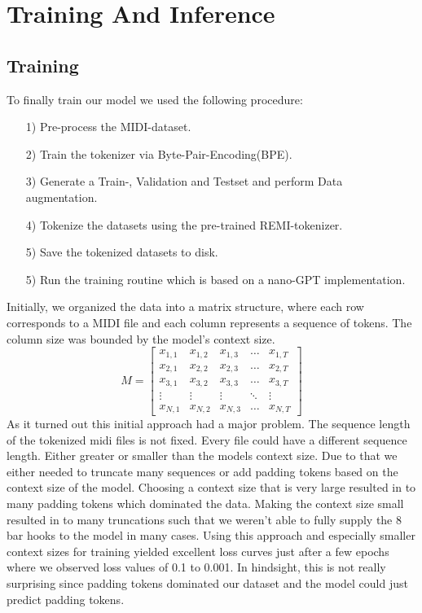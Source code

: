 \documentclass[a4paper,12pt]{extarticle}
\begin{document}
\section{Training And Inference}
\subsection{Training}
    \label{sec:Training}
To finally train our model we used the following procedure:
    \begin{itemize}
        \item[1)] Pre-process the MIDI-dataset.
        \item[2)] Train the tokenizer via Byte-Pair-Encoding(BPE).
        \item[3)] Generate a Train-, Validation and Testset and perform Data augmentation.
        \item[4)] Tokenize the datasets using the pre-trained REMI-tokenizer.
        \item[5)] Save the tokenized datasets to disk.
        \item[5)] Run the training routine which is based on a nano-GPT implementation.
    \end{itemize}
Initially, we organized the data into a matrix structure, where each row corresponds to a MIDI file and each column represents a sequence of tokens. The column size was bounded by the model's context size.
\[
M =
\begin{bmatrix}
    x_{1,1} & x_{1,2} & x_{1,3} & \dots & x_{1,T} \\
    x_{2,1} & x_{2,2} & x_{2,3} & \dots & x_{2,T} \\
    x_{3,1} & x_{3,2} & x_{3,3} & \dots & x_{3,T} \\
    \vdots  & \vdots  & \vdots  & \ddots & \vdots  \\
    x_{N,1} & x_{N,2} & x_{N,3} & \dots & x_{N,T}
\end{bmatrix}
\]
As it turned out this initial approach had a major problem.
The sequence length of the tokenized midi files is not fixed. Every file could have a different sequence length. Either greater or smaller than the models context size. Due to that we either needed to truncate many sequences or add padding tokens based on the context size of the model. Choosing a context size that is very large resulted in to many padding tokens which dominated the data. Making the context size small resulted in to many truncations such that we weren't able to fully supply the 8 bar hooks to the model in many cases. Using this approach and especially smaller context sizes for training yielded excellent loss curves just after a few epochs where we observed loss values of 0.1 to 0.001. In hindsight, this is not really surprising since padding tokens dominated our dataset and the model could just predict padding tokens. 
\end{document}
